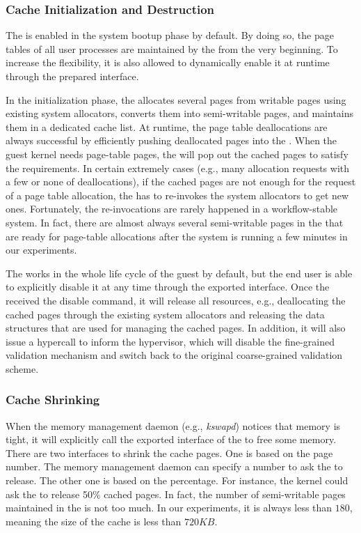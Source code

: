 \subsubsection{\name Cache Initialization and Destruction}
The \cache is enabled in the system bootup phase by default.
By doing so, the page tables of all user processes are maintained by the \cache from the very beginning.
To increase the flexibility, it is also allowed to dynamically enable it at runtime through the prepared interface.

In the initialization phase, the \cache allocates several pages from writable pages using existing system allocators, converts them into semi-writable pages, and maintains them in a dedicated cache list.
At runtime, the page table deallocations are always successful by efficiently pushing deallocated pages into the \cache.
When the guest kernel needs page-table pages, the \cache  will pop out the cached pages to satisfy the requirements.
In certain extremely cases (e.g., many allocation requests with a few or none of deallocations), if the cached pages are not enough for the request of a page table allocation, the \cache has to re-invokes the system allocators to get new ones.
Fortunately, the re-invocations are rarely happened in a workflow-stable system.
In fact, there are almost always several semi-writable pages in the \cache that are ready for page-table allocations after the system is running a few minutes in our experiments.

The \cache works in the whole life cycle of the guest by default, but the end  user is able to explicitly disable it at any time through the exported interface.
Once the \cache received the disable command, it will release all resources, e.g., deallocating the cached pages through the existing system allocators and releasing the data structures that are used for managing the cached pages.
In addition, it will also issue a hypercall to inform the hypervisor, which will disable the fine-grained validation mechanism and switch back to the original coarse-grained validation scheme.

\subsubsection{Cache Shrinking}
When the memory management daemon (e.g., \emph{kswapd}) notices that memory is tight, it will explicitly call the exported interface of the \cache to free some memory.
There are two interfaces to shrink the cache pages. One is based on the page number. The memory management daemon can specify a number to ask the \cache to release.
The other one is based on the percentage. For instance, the kernel could ask the \cache to release 50\% cached pages.
In fact, the number of semi-writable pages maintained in the \cache is not too much. In our experiments, it is always less than $180$, meaning the size of the cache is less than $720KB$.

